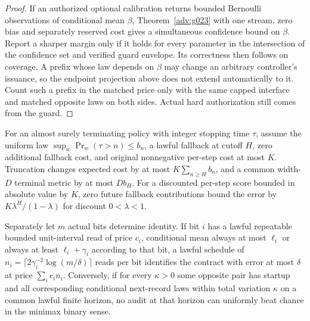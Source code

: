 \begin{proof}
If an authorized optional calibration returns bounded Bernoulli observations of conditional mean \(\beta\), Theorem~\ref{adv:g023} with one stream, zero bias and separately reserved cost gives a simultaneous confidence bound on \(\beta\). Report a sharper margin only if it holds for every parameter in the intersection of the confidence set and verified guard envelope. Its correctness then follows on coverage. A prefix whose law depends on \(\beta\) may change an arbitrary controller's issuance, so the endpoint projection above does not extend automatically to it. Count such a prefix in the matched price only with the same capped interface and matched opposite laws on both sides. Actual hard authorization still comes from the guard.
\end{proof}

\begin{theorem}\label{adv:ug4}
For an almost surely terminating policy with integer stopping time \(\tau\), assume the uniform law \(\sup_w\Pr_w(\tau>n)\le b_n\), a lawful fallback at cutoff \(H\), zero additional fallback cost, and original nonnegative per-step cost at most \(K\). Truncation changes expected cost by at most \(K\sum_{n\ge H}b_n\), and a common width-\(D\) terminal metric by at most \(Db_H\). For a discounted per-step score bounded in absolute value by \(K\), zero future fallback contributions bound the error by \(K\lambda^H/(1-\lambda)\) for discount \(0<\lambda<1\).

Separately let \(m\) actual bits determine identity. If bit \(i\) has a lawful repeatable bounded unit-interval read of price \(c_i\), conditional mean always at most \(\ell_i\) or always at least \(\ell_i+\gamma_i\) according to that bit, a lawful schedule of \(n_i=\lceil2\gamma_i^{-2}\log(m/\delta)\rceil\) reads per bit identifies the contract with error at most \(\delta\) at price \(\sum_i c_i n_i\). Conversely, if for every \(\kappa>0\) some opposite pair has startup and all corresponding conditional next-record laws within total variation \(\kappa\) on a common lawful finite horizon, no audit at that horizon can uniformly beat chance in the minimax binary sense.
\end{theorem}
